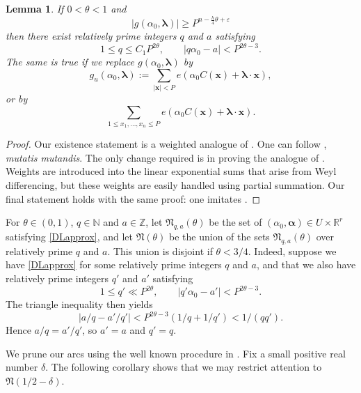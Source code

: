 \documentclass[12pt,reqno]{amsart}
\newtheorem{lemma}[thm]{Lemma}
\theoremstyle{definition}
\theoremstyle{remark}
\numberwithin{equation}{section}
\begin{document}
\begin{lemma} \label{DL} If $0 < {{\theta}} < 1$ and 
\[
|g({{\alpha}}_0, {{\boldsymbol {{\lambda}}}})| {\geqslant} P^{n- \frac h4 {{\theta}} + {\varepsilon}}
\]
then there exist relatively prime integers $q$ and $a$ satisfying
\begin{equation} \label{DLapprox}
1 {\leqslant} q {\leqslant} C_1 P^{2 {{\theta}}}, \qquad |q {{\alpha}}_0 - a| < P^{2 {{\theta}} - 3}.
\end{equation}
The same is true if we replace $g({{\alpha}}_0, {{\boldsymbol {{\lambda}}}})$ by 
\begin{equation} \label{gudef}
g_u({{\alpha}}_0,{{\boldsymbol {{\lambda}}}}) := \sum_{|{\mathbf x}| < P} e({{\alpha}}_0 C({\mathbf x}) + {{\boldsymbol {{\lambda}}}} \cdot {\mathbf x}),
\end{equation}
or by
\[
\sum_{1 {\leqslant} x_1, \ldots, x_n {\leqslant} P} e({{\alpha}}_0C({\mathbf x}) + {{\boldsymbol {{\lambda}}}} \cdot {\mathbf x}).
\]
\end{lemma}

\begin{proof} 
Our existence statement is a weighted analogue of \cite[Lemma 4]{DL1964}. One can follow \cite[\S 3]{DL1964}, \emph{mutatis mutandis}. The only change required is in proving the analogue of \cite[Lemma 1]{DL1964}. Weights are introduced into the linear exponential sums that arise from Weyl differencing, but these weights are easily handled using partial summation. Our final statement holds with the same proof: one imitates \cite[\S 3]{DL1964}.
\end{proof}

For ${{\theta}} \in (0,1)$, $q \in {\mathbb N}$ and $a \in {\mathbb Z}$, let ${\mathfrak N}_{q,a}({{\theta}})$ be the set of $({{\alpha}}_0,{\boldsymbol{{\alpha}}}) \in U \times {\mathbb R}^r$ satisfying \eqref{DLapprox}, and let ${\mathfrak N}({{\theta}})$ be the union of the sets ${\mathfrak N}_{q,a}({{\theta}})$ over relatively prime $q$ and $a$. This union is disjoint if ${{\theta}} < 3/4$. Indeed, suppose we have \eqref{DLapprox} for some relatively prime integers $q$ and $a$, and that we also have relatively prime integers $q'$ and $a'$ satisfying
\[
1 {\leqslant} q' \ll P^{2{{\theta}}}, \qquad |q' {{\alpha}}_0 - a'| < P^{2{{\theta}}-3}.
\]
The triangle inequality then yields
\[
|a/q - a'/q'| < P^{2 {{\theta}} - 3} (1/q + 1/q') < 1/(qq').
\]
Hence $a/q = a'/q'$, so $a'=a$ and $q'=q$.

We prune our arcs using the well known procedure in \cite[Lemma 15.1]{Dav2005}. Fix a small positive real number ${{\delta}}$. The following corollary shows that we may restrict attention to ${\mathfrak N}(1/2 - {{\delta}})$. 
\end{document}
